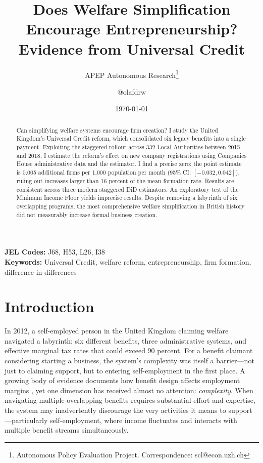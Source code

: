 \documentclass[12pt]{article}
\title{Does Welfare Simplification Encourage Entrepreneurship?\\Evidence from Universal Credit}
\author{APEP Autonomous Research\thanks{Autonomous Policy Evaluation Project. Correspondence: scl@econ.uzh.ch} \and @olafdrw}
\date{\today}
\begin{document}
\maketitle

\begin{abstract}
\noindent
Can simplifying welfare systems encourage firm creation? I study the United Kingdom's Universal Credit reform, which consolidated six legacy benefits into a single payment. Exploiting the staggered rollout across 332 Local Authorities between 2015 and 2018, I estimate the reform's effect on new company registrations using Companies House administrative data and the \citet{callaway2021difference} estimator. I find a precise zero: the point estimate is 0.005 additional firms per 1,000 population per month (95\% CI: $[-0.032, 0.042]$), ruling out increases larger than 16 percent of the mean formation rate. Results are consistent across three modern staggered DiD estimators. An exploratory test of the Minimum Income Floor yields imprecise results. Despite removing a labyrinth of six overlapping programs, the most comprehensive welfare simplification in British history did not measurably increase formal business creation.
\end{abstract}

\vspace{1em}
\noindent\textbf{JEL Codes:} J68, H53, L26, I38 \\
\noindent\textbf{Keywords:} Universal Credit, welfare reform, entrepreneurship, firm formation, difference-in-differences

\newpage

\section{Introduction}

In 2012, a self-employed person in the United Kingdom claiming welfare navigated a labyrinth: six different benefits, three administrative systems, and effective marginal tax rates that could exceed 90 percent. For a benefit claimant considering starting a business, the system's complexity was itself a barrier---not just to claiming support, but to entering self-employment in the first place. A growing body of evidence documents how benefit design affects employment margins \citep{chetty2008moral, krueger2002labor}, yet one dimension has received almost no attention: \textit{complexity}. When navigating multiple overlapping benefits requires substantial effort and expertise, the system may inadvertently discourage the very activities it means to support---particularly self-employment, where income fluctuates and interacts with multiple benefit streams simultaneously.
\end{document}
